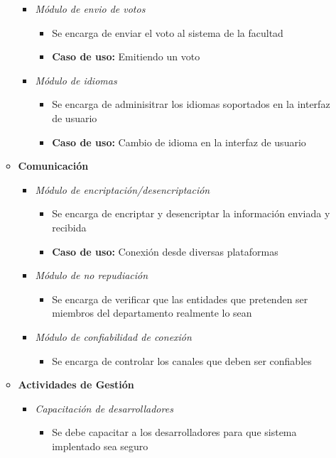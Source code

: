 \begin{itemize}
\begin{itemize}
\begin{itemize}
\begin{itemize}
\end{itemize}
 \item \emph{M\'odulo de envio de votos}
\begin{itemize}
 \item Se encarga de enviar el voto al sistema de la facultad
 \item {\bf Caso de uso:} Emitiendo un voto
\end{itemize}
 \item \emph{M\'odulo de idiomas}
\begin{itemize}
 \item Se encarga de adminisitrar los idiomas soportados en la interfaz de usuario
 \item {\bf Caso de uso:} Cambio de idioma en la interfaz de usuario
\end{itemize}
\end{itemize}
 \item {\bf Comunicación}
\begin{itemize}
 \item \emph{M\'odulo de encriptación/desencriptación}
\begin{itemize}
 \item Se encarga de encriptar y desencriptar la información enviada y recibida
 \item {\bf Caso de uso:} Conexión desde diversas plataformas
\end{itemize}
 \item \emph{M\'odulo de no repudiación}
\begin{itemize}
 \item Se encarga de verificar que las entidades que pretenden ser miembros del departamento realmente lo sean
\end{itemize}
 \item \emph{M\'odulo de confiabilidad de conexión}
\begin{itemize}
 \item Se encarga de controlar los canales que deben ser confiables
\end{itemize}
\end{itemize}
 \item {\bf Actividades de Gestión}
\begin{itemize}
 \item \emph{Capacitación de desarrolladores}
\begin{itemize}
 \item Se debe capacitar a los desarrolladores para que sistema implentado sea seguro
\end{itemize}

\end{itemize}
\end{itemize}
\end{itemize}

